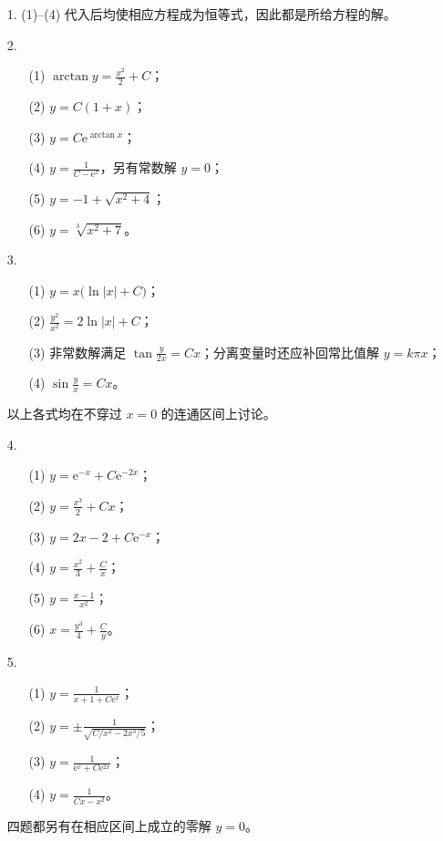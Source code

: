 \documentclass[fontset=fandol]{ctexart}
\newcommand{\ee}{\mathrm{e}}
\begin{document}
\begin{enumerate}
\item[1.] (1)--(4) 代入后均使相应方程成为恒等式，因此都是所给方程的解。
\item[2.]
\begin{enumerate}
\item[(1)] $\displaystyle \arctan y=\frac{x^2}{2}+C$；
\item[(2)] $y=C(1+x)$；
\item[(3)] $\displaystyle y=C\ee^{\arctan x}$；
\item[(4)] $\displaystyle y=\frac1{C-\ee^x}$，另有常数解 $y=0$；
\item[(5)] $\displaystyle y=-1+\sqrt{x^2+4}$；
\item[(6)] $\displaystyle y=\sqrt[3]{x^2+7}$。
\end{enumerate}
\item[3.]
\begin{enumerate}
\item[(1)] $\displaystyle y=x\bigl(\ln|x|+C\bigr)$；
\item[(2)] $\displaystyle \frac{y^2}{x^2}=2\ln|x|+C$；
\item[(3)] 非常数解满足 $\displaystyle \tan\frac{y}{2x}=Cx$；分离变量时还应补回常比值解 $y=k\pi x$；
\item[(4)] $\displaystyle \sin\frac{y}{x}=Cx$。
\end{enumerate}
以上各式均在不穿过 $x=0$ 的连通区间上讨论。
\item[4.]
\begin{enumerate}
\item[(1)] $\displaystyle y=\ee^{-x}+C\ee^{-2x}$；
\item[(2)] $\displaystyle y=\frac{x^3}{2}+Cx$；
\item[(3)] $\displaystyle y=2x-2+C\ee^{-x}$；
\item[(4)] $\displaystyle y=\frac{x^2}{3}+\frac{C}{x}$；
\item[(5)] $\displaystyle y=\frac{x-1}{x^2}$；
\item[(6)] $\displaystyle x=\frac{y^3}{4}+\frac{C}{y}$。
\end{enumerate}
\item[5.]
\begin{enumerate}
\item[(1)] $\displaystyle y=\frac1{x+1+C\ee^x}$；
\item[(2)] $\displaystyle y=\pm\frac1{\sqrt{C/x^2-2x^3/5}}$；
\item[(3)] $\displaystyle y=\frac1{\ee^x+C\ee^{2x}}$；
\item[(4)] $\displaystyle y=\frac1{Cx-x^2}$。
\end{enumerate}
四题都另有在相应区间上成立的零解 $y=0$。
\end{enumerate}
\end{document}
